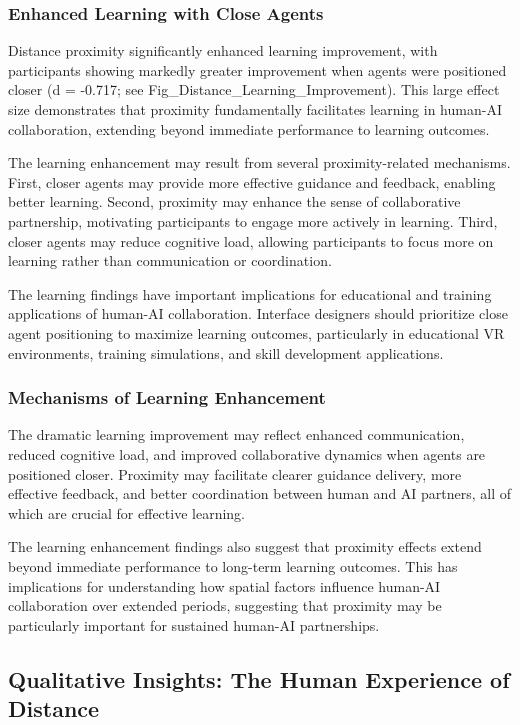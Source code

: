 \documentclass[12pt]{article}
\begin{document}
\subsubsection{Enhanced Learning with Close Agents}

Distance proximity significantly enhanced learning improvement, with participants showing markedly greater improvement when agents were positioned closer (d = -0.717; see Fig\_Distance\_Learning\_Improvement). This large effect size demonstrates that proximity fundamentally facilitates learning in human-AI collaboration, extending beyond immediate performance to learning outcomes.

The learning enhancement may result from several proximity-related mechanisms. First, closer agents may provide more effective guidance and feedback, enabling better learning. Second, proximity may enhance the sense of collaborative partnership, motivating participants to engage more actively in learning. Third, closer agents may reduce cognitive load, allowing participants to focus more on learning rather than communication or coordination.

The learning findings have important implications for educational and training applications of human-AI collaboration. Interface designers should prioritize close agent positioning to maximize learning outcomes, particularly in educational VR environments, training simulations, and skill development applications.

\subsubsection{Mechanisms of Learning Enhancement}

The dramatic learning improvement may reflect enhanced communication, reduced cognitive load, and improved collaborative dynamics when agents are positioned closer. Proximity may facilitate clearer guidance delivery, more effective feedback, and better coordination between human and AI partners, all of which are crucial for effective learning.

The learning enhancement findings also suggest that proximity effects extend beyond immediate performance to long-term learning outcomes. This has implications for understanding how spatial factors influence human-AI collaboration over extended periods, suggesting that proximity may be particularly important for sustained human-AI partnerships.

\subsection{Qualitative Insights: The Human Experience of Distance}
\end{document}
